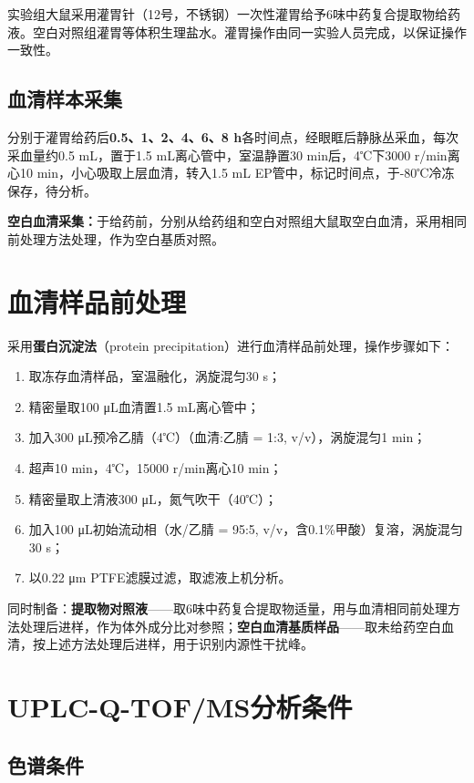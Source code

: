 \documentclass[12pt,a4paper,UTF8,openany]{ctexbook}
\newcommand{\keyterm}[1]{\textbf{#1}}
\begin{document}
实验组大鼠采用灌胃针（12号，不锈钢）一次性灌胃给予6味中药复合提取物给药液。空白对照组灌胃等体积生理盐水。灌胃操作由同一实验人员完成，以保证操作一致性。

\subsection{血清样本采集}

分别于灌胃给药后\textbf{0.5、1、2、4、6、8 h}各时间点，经眼眶后静脉丛采血，每次采血量约0.5 mL，置于1.5 mL离心管中，室温静置30 min后，4℃下3000 r/min离心10 min，小心吸取上层血清，转入1.5 mL EP管中，标记时间点，于-80℃冷冻保存，待分析。

\noindent\textbf{空白血清采集：}于给药前，分别从给药组和空白对照组大鼠取空白血清，采用相同前处理方法处理，作为空白基质对照。

\section{血清样品前处理}

采用\keyterm{蛋白沉淀法}（protein precipitation）进行血清样品前处理，操作步骤如下：

\begin{enumerate}
  \item 取冻存血清样品，室温融化，涡旋混匀30 s；
  \item 精密量取100 μL血清置1.5 mL离心管中；
  \item 加入300 μL预冷乙腈（4℃）（血清:乙腈 = 1:3, v/v），涡旋混匀1 min；
  \item 超声10 min，4℃，15000 r/min离心10 min；
  \item 精密量取上清液300 μL，氮气吹干（40℃）；
  \item 加入100 μL初始流动相（水/乙腈 = 95:5, v/v，含0.1\%甲酸）复溶，涡旋混匀30 s；
  \item 以0.22 μm PTFE滤膜过滤，取滤液上机分析。
\end{enumerate}

同时制备：\textbf{提取物对照液}——取6味中药复合提取物适量，用与血清相同前处理方法处理后进样，作为体外成分比对参照；\textbf{空白血清基质样品}——取未给药空白血清，按上述方法处理后进样，用于识别内源性干扰峰。

\section{UPLC-Q-TOF/MS分析条件}

\subsection{色谱条件}
\end{document}
